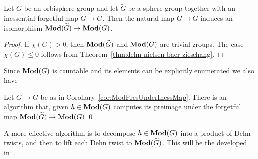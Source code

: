 \documentclass{amsart}
\begin{document}
\begin{cor}\label{cor:ModPresUnderInessMap}
  Let $G$ be an orbisphere group and let $\widetilde G$ be a
  sphere group together with an inessential forgetful map
  $\widetilde G\to G$. Then the natural map $\widetilde G\to G$
  induces an isomorphism $\mathbf{\relax Mod}(\widetilde G)\to\mathbf{\relax Mod}(G)$.
\end{cor}
\begin{proof}
  If $\chi(G)>0$, then $\mathbf{\relax Mod}(\widetilde G)$ and $\mathbf{\relax Mod}( G)$ are trivial
  groups. The case $\chi(G)\le 0$ follows from
  Theorem~\ref{thm:dehn-nielsen-baer-zieschang}.
\end{proof}
\noindent Since $\mathbf{\relax Mod}(G)$ is countable and its elements can be
explicitly enumerated we also have
\begin{cor}\label{cor:can lift groups}
  Let $\widetilde G\to G$ be as in
  Corollary~\ref{cor:ModPresUnderInessMap}. There is an algorithm
  that, given $h\in \mathbf{\relax Mod}(G)$ computes its preimage under the
  forgetful map $\mathbf{\relax Mod}(\widetilde G)\to\mathbf{\relax Mod}(G)$.\qed
\end{cor}

\begin{rem}
  A more effective algorithm is to decompose $h\in \mathbf{\relax Mod}(G)$ into a
  product of Dehn twists, and then to lift each Dehn twist to
  $\mathbf{\relax Mod}(\widetilde G)$. This will be the developed
  in~\cite{bartholdi-dudko:bc5}.
\end{rem}
\end{document}
